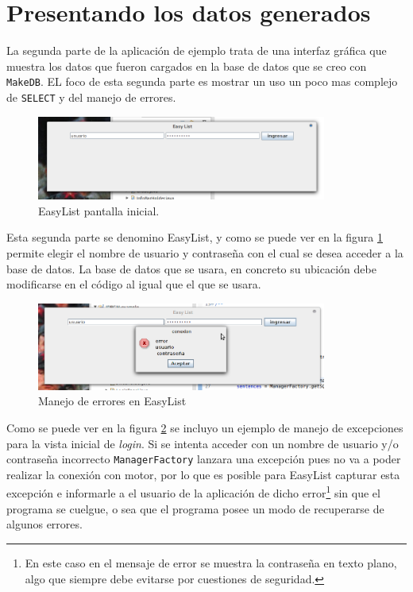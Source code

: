 \section{Presentando los datos generados}
La segunda parte de la aplicación de ejemplo trata de una interfaz gráfica que muestra los datos que fueron cargados en la base de datos que se creo con \verb=MakeDB=. EL foco de esta segunda parte es mostrar un uso un poco mas complejo de \verb=SELECT= y del manejo de errores.
%

\begin{figure}[h]
  \centering
    \includegraphics[width=0.85\textwidth]{figuras/ejemplo-a.png}
  \caption{EasyList pantalla inicial.}
  \label{fig:easylist-inicio}
\end{figure}

Esta segunda parte se denomino EasyList, y como se puede ver en la figura \ref{fig:easylist-inicio} permite elegir el nombre de usuario y contraseña con el cual se desea acceder a la base de datos. La base de datos que se usara, en concreto su ubicación debe modificarse en el código al igual que el \dd que se usara.
%

\begin{figure}[h]
  \centering
    \includegraphics[width=0.85\textwidth]{figuras/ejemplo-b.png}
  \caption{Manejo de errores en EasyList}
  \label{fig:easylist-error}
\end{figure}
%

Como se puede ver en la figura \ref{fig:easylist-error} se incluyo un ejemplo de manejo de excepciones para la vista inicial de \textit{login}. Si se intenta acceder con un nombre de usuario y/o contraseña incorrecto \verb=ManagerFactory= lanzara una excepción pues no va a poder realizar la conexión con motor, por lo que es posible para EasyList capturar esta excepción e informarle a el usuario de la aplicación de dicho error\footnote{En este caso en el mensaje de error se muestra la contraseña en texto plano, algo que siempre debe evitarse por cuestiones de seguridad.} sin que el programa se cuelgue, o sea que el programa posee un modo de recuperarse de algunos errores.

